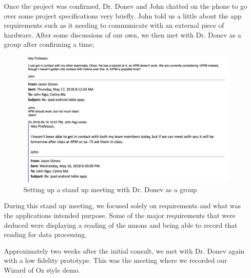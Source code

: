 \documentclass[11pt,a4paper]{article}
\begin{document}
\newpage
Once the project was confirmed, Dr. Donev and John chatted on the phone to go over some project specifications very briefly. John told us a little about the app requirements such as it needing to communicate with an external piece of hardware. After some discussions of our own, we then met with Dr. Donev as a group after confirming a time;


\bigskip
\begin{figure}[h]
  \centering
      \includegraphics[width=1.1\textwidth]{3.png}

  \caption{Setting up a stand up meeting with Dr. Donev as a group}
\end{figure}


During this stand up meeting, we focused solely on requirements and what was the applications intended purpose. Some of the major requirements that were deduced were displaying a reading of the muons and being able to record that reading for data processing.

Approximately two weeks after the initial consult, we met with Dr. Donev again with a low fidelity prototype. This was the meeting where we recorded our Wizard of Oz style demo. 
\end{document}

